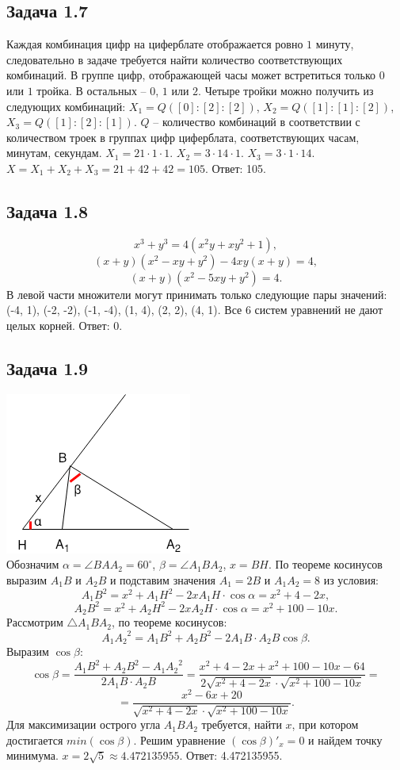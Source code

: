 \documentclass[12pt]{article}
\begin{document}
\subsection*{Задача 1.7}
Каждая комбинация цифр на циферблате отображается ровно $1$ минуту, следовательно в задаче требуется найти количество соответствующих комбинаций. В группе цифр, отображающей часы может встретиться только $0$ или $1$ тройка. В остальных -- $0$, $1$ или $2$. Четыре тройки можно получить из следующих комбинаций: $X_1 = Q([0]:[2]:[2])$, $X_2 = Q([1]:[1]:[2])$, $X_3 = Q([1]:[2]:[1])$. $Q$ -- количество комбинаций в соответствии с количеством троек в группах цифр циферблата, соответствующих часам, минутам, секундам. $X_1 = 21 \cdot 1 \cdot 1$. $X_2 = 3 \cdot 14 \cdot 1$. $X_3 = 3 \cdot 1 \cdot 14$. $X = X_1 + X_2 + X_3 = 21 + 42 + 42 = 105$. Ответ: 105.

\subsection*{Задача 1.8}
$$x^3 + y^3 = 4(x^2y + xy^2 + 1),$$
$$(x+y)(x^2-xy+y^2) - 4xy(x + y) = 4,$$
$$(x+y)(x^2-5xy+y^2) = 4.$$
В левой части множители могут принимать только следующие пары значений: (-4, 1), (-2, -2), (-1, -4), (1, 4), (2, 2), (4, 1). Все 6 систем уравнений не дают целых корней. Ответ: 0. 

\subsection*{Задача 1.9}
\includegraphics{math19}\\
Обозначим $\alpha = \angle BAA_2=60^{\circ}$, $\beta = \angle A_1BA_2$, $x = BH$. По теореме косинусов выразим $A_1B$ и $A_2B$ и подставим значения $A_1 = 2B$ и $A_1A_2 = 8$ из условия:
$$A_1B^2 = x^2 + A_1H^2 - 2xA_1H\cdot \cos\alpha = x^2 + 4 - 2x,$$
$$A_2B^2 = x^2 + A_2H^2 - 2xA_2H\cdot \cos\alpha = x^2 + 100 - 10x.$$
Рассмотрим $\triangle A_1BA_2$, по теореме косинусов:
$${A_1A_2}^2 = A_1B^2 + A_2B^2 - 2A_1B\cdot A_2B \cos\beta.$$
Выразим $\cos\beta$:
$$\cos\beta = \frac{A_1B^2 + A_2B^2 - {A_1A_2}^2}{2A_1B\cdot A_2B} = \frac{x^2 + 4 - 2x + x^2 + 100 - 10x - 64}{2\sqrt{x^2 + 4 - 2x} \cdot \sqrt{x^2 + 100 - 10x}} =  $$
$$=\frac{x^2 - 6x + 20}{\sqrt{x^2 + 4 - 2x} \cdot \sqrt{x^2 + 100 - 10x}}.$$
Для максимизации острого угла $A_1BA_2$ требуется, найти $x$, при котором достигается $min(\cos\beta)$. Решим уравнение $(\cos\beta)'_x = 0$ и найдем точку минимума. $x = 2\sqrt{5} \approx 4.472135955$. Ответ: 4.472135955.
\end{document}
